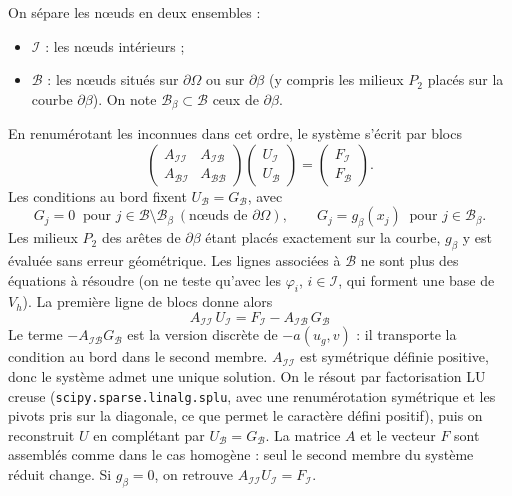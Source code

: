 \documentclass[11pt,a4paper]{article}
\begin{document}
On sépare les nœuds en deux ensembles :
\begin{itemize}
  \item $\mathcal{I}$ : les nœuds intérieurs ;
  \item $\mathcal{B}$ : les nœuds situés sur $\partial\Omega$ ou sur
        $\partial\beta$ (y compris les milieux $P_2$ placés sur la courbe
        $\partial\beta$). On note $\mathcal{B}_\beta \subset \mathcal{B}$
        ceux de $\partial\beta$.
\end{itemize}
En renumérotant les inconnues dans cet ordre, le système s'écrit par blocs
\[
\begin{pmatrix}
A_{\mathcal{I}\mathcal{I}} & A_{\mathcal{I}\mathcal{B}} \\
A_{\mathcal{B}\mathcal{I}} & A_{\mathcal{B}\mathcal{B}}
\end{pmatrix}
\begin{pmatrix} U_{\mathcal{I}} \\ U_{\mathcal{B}} \end{pmatrix}
=
\begin{pmatrix} F_{\mathcal{I}} \\ F_{\mathcal{B}} \end{pmatrix}.
\]
Les conditions au bord fixent $U_{\mathcal{B}} = G_{\mathcal{B}}$, avec
\[
G_j = 0 \ \text{ pour } j \in \mathcal{B} \setminus \mathcal{B}_\beta
\ (\text{nœuds de } \partial\Omega),
\qquad
G_j = g_\beta(x_j) \ \text{ pour } j \in \mathcal{B}_\beta .
\]
Les milieux $P_2$ des arêtes de $\partial\beta$ étant placés exactement sur
la courbe, $g_\beta$ y est évaluée sans erreur géométrique. Les lignes
associées à $\mathcal{B}$ ne sont plus des équations à résoudre (on ne
teste qu'avec les $\varphi_i$, $i \in \mathcal{I}$, qui forment une base de
$V_h$). La première ligne de blocs donne alors
\[
\boxed{\ A_{\mathcal{I}\mathcal{I}}\, U_{\mathcal{I}} = F_{\mathcal{I}}
- A_{\mathcal{I}\mathcal{B}}\, G_{\mathcal{B}}\ }
\]
Le terme $-A_{\mathcal{I}\mathcal{B}} G_{\mathcal{B}}$ est la version
discrète de $-a(u_g, v)$ : il transporte la condition au bord dans le
second membre. $A_{\mathcal{I}\mathcal{I}}$ est symétrique définie positive,
donc le système admet une unique solution. On le résout par factorisation
LU creuse (\texttt{scipy.sparse.linalg.splu}, avec une renumérotation
symétrique et les pivots pris sur la diagonale, ce que permet le caractère
défini positif), puis on reconstruit $U$ en complétant par $U_{\mathcal{B}} = G_{\mathcal{B}}$. La
matrice $A$ et le vecteur $F$ sont assemblés comme dans le cas homogène :
seul le second membre du système réduit change. Si $g_\beta = 0$, on
retrouve $A_{\mathcal{I}\mathcal{I}} U_{\mathcal{I}} = F_{\mathcal{I}}$.
\end{document}

